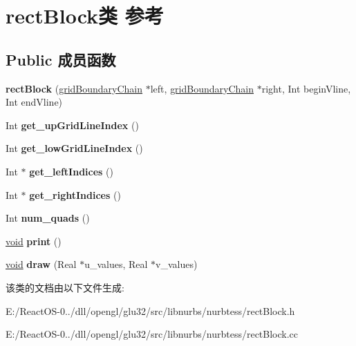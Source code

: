 \hypertarget{classrect_block}{}\section{rect\+Block类 参考}
\label{classrect_block}
\subsection*{Public 成员函数}
\begin{DoxyCompactItemize}
\item 
\mbox{\label{classrect_block_a5673521c29e067b803fa4f9d3c486220}} 
{\bfseries rect\+Block} (\hyperlink{classgrid_boundary_chain}{grid\+Boundary\+Chain} $\ast$left, \hyperlink{classgrid_boundary_chain}{grid\+Boundary\+Chain} $\ast$right, Int begin\+Vline, Int end\+Vline)
\item 
\mbox{\label{classrect_block_ab7d05c2f916e02688f40e5b3879bf3d0}} 
Int {\bfseries get\+\_\+up\+Grid\+Line\+Index} ()
\item 
\mbox{\label{classrect_block_afcd71ab9e671c33953f1daa808cf9f75}} 
Int {\bfseries get\+\_\+low\+Grid\+Line\+Index} ()
\item 
\mbox{\label{classrect_block_ae9f74f9e815c040095f25b0cb4dbb0aa}} 
Int $\ast$ {\bfseries get\+\_\+left\+Indices} ()
\item 
\mbox{\label{classrect_block_a9d34b3ddad6bf0f2a7daf0d0a16d02e3}} 
Int $\ast$ {\bfseries get\+\_\+right\+Indices} ()
\item 
\mbox{\label{classrect_block_a0aa9639347a2cc89fbf75af2ecc28d02}} 
Int {\bfseries num\+\_\+quads} ()
\item 
\mbox{\label{classrect_block_aad278723b1f115f28db8d0c4ad5b14be}} 
\hyperlink{interfacevoid}{void} {\bfseries print} ()
\item 
\mbox{\label{classrect_block_af26425c04e7369696f2a3f328ef516ef}} 
\hyperlink{interfacevoid}{void} {\bfseries draw} (Real $\ast$u\+\_\+values, Real $\ast$v\+\_\+values)
\end{DoxyCompactItemize}


该类的文档由以下文件生成\+:\begin{DoxyCompactItemize}
\item 
E\+:/\+React\+O\+S-\/0../dll/opengl/glu32/src/libnurbs/nurbtess/rect\+Block.\+h\item 
E\+:/\+React\+O\+S-\/0../dll/opengl/glu32/src/libnurbs/nurbtess/rect\+Block.\+cc\end{DoxyCompactItemize}
